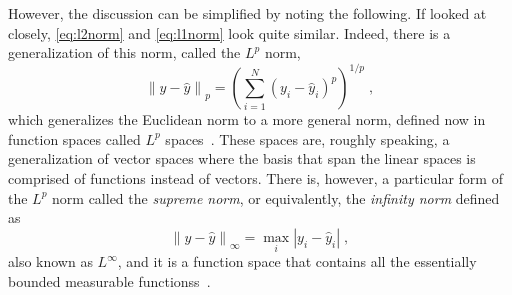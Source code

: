 However, the discussion can be simplified by noting the following. If looked at closely,
\autoref{eq:l2norm} and \autoref{eq:l1norm} look quite similar. Indeed, there is a generalization of this norm, called the $L^p$ norm,
\begin{equation}
    { \left\lVert y - \hat{y} \right\rVert }_{p} = { \left( \sum_{i=1}^{N} { \left(y_i - \hat{y}_i \right) }^{p} \right) }^{1/p}
    \; ,
    \label{eq:lp-norm}
\end{equation}
which generalizes the Euclidean norm to a more general norm, defined now in function spaces 
called $L^p$ spaces~\cite{rudinPrinciplesMathematicalAnalysis2013}. These spaces are, 
roughly speaking, a generalization of vector spaces where the basis that span the linear 
spaces is comprised of functions instead of vectors. There is, however, a particular form of the $L^p$ norm called the \emph{supreme norm}, or equivalently, the \emph{infinity norm} defined as
\begin{equation}
    { \left\lVert y - \hat{y} \right\rVert }_{\infty} = 
    \underset{i}{\max}{\left\lvert y_i - \hat{y}_{i} \right\rvert}
    \; ,
    \label{eq:linf-norm}
\end{equation}
also known as \(L^{\infty}\), and it is a function space that contains all the essentially bounded measurable functionss~\cite{taoIntroductionMeasureTheory2011}.


